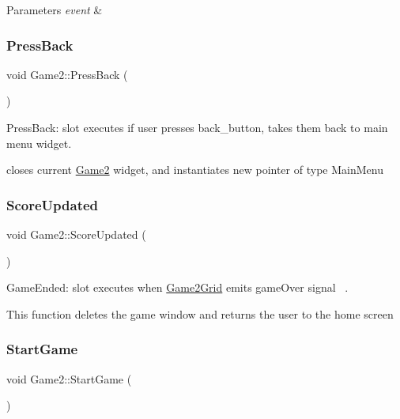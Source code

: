 \begin{DoxyParams}{Parameters}
{\em event} & \\
\hline
\end{DoxyParams}
\mbox{\label{classGame2_a06e537364fffde28c04697db4855ade0}} 
\subsubsection{\texorpdfstring{Press\+Back}{PressBack}}
{\footnotesize\ttfamily void Game2\+::\+Press\+Back (\begin{DoxyParamCaption}{ }\end{DoxyParamCaption})\hspace{0.3cm}{\ttfamily [slot]}}



Press\+Back\+: slot executes if user presses back\+\_\+button, takes them back to main menu widget. 

closes current \hyperlink{classGame2}{Game2} widget, and instantiates new pointer of type Main\+Menu \mbox{\label{classGame2_adea8085cc1e37f1103f7efabc0fe8244}} 
\subsubsection{\texorpdfstring{Score\+Updated}{ScoreUpdated}}
{\footnotesize\ttfamily void Game2\+::\+Score\+Updated (\begin{DoxyParamCaption}{ }\end{DoxyParamCaption})\hspace{0.3cm}{\ttfamily [slot]}}



Game\+Ended\+: slot executes when \hyperlink{classGame2Grid}{Game2\+Grid} emits game\+Over signal~\newline
. 

This function deletes the game window and returns the user to the home screen \mbox{\label{classGame2_a2f51124a2ec3758fbc1bfd056ca137b6}} 
\subsubsection{\texorpdfstring{Start\+Game}{StartGame}}
{\footnotesize\ttfamily void Game2\+::\+Start\+Game (\begin{DoxyParamCaption}{ }\end{DoxyParamCaption})\hspace{0.3cm}{\ttfamily [slot]}}



